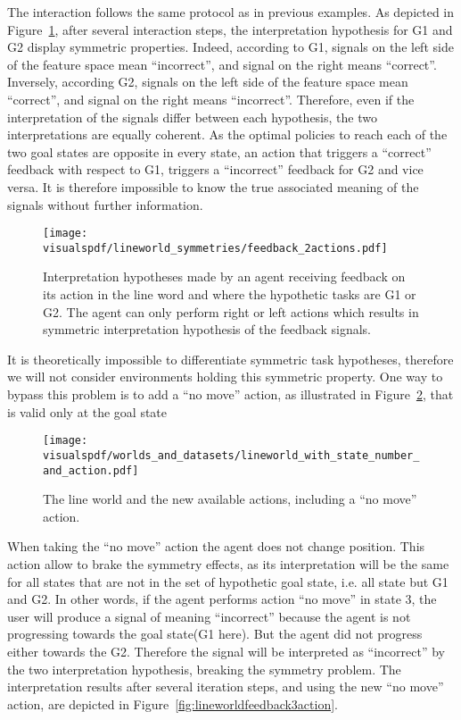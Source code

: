 The interaction follows the same protocol as in previous examples. As depicted in Figure~\ref{fig:lineworldfeedback2action}, after several interaction steps, the interpretation hypothesis for G1 and G2 display symmetric properties. Indeed, according to G1, signals on the left side of the feature space mean ``incorrect'', and signal on the right means ``correct''. Inversely, according G2, signals on the left side of the feature space mean ``correct'', and signal on the right means ``incorrect''. Therefore, even if the interpretation of the signals differ between each hypothesis, the two interpretations are equally coherent. As the optimal policies to reach each of the two goal states are opposite in every state, an action that triggers a ``correct'' feedback with respect to G1, triggers a ``incorrect'' feedback for G2 and vice versa. It is therefore impossible to know the true associated meaning of the signals without further information.

\begin{figure}[!htbp]
  \centering
  \texttt{[image: \\visualspdf/lineworld\_symmetries/feedback\_2actions.pdf]}
  \caption{Interpretation hypotheses made by an agent receiving feedback on its action in the line word and where the hypothetic tasks are G1 or G2. The agent can only perform right or left actions which results in symmetric interpretation hypothesis of the feedback signals.}
  \label{fig:lineworldfeedback2action}
\end{figure}

It is theoretically impossible to differentiate symmetric task hypotheses, therefore we will not consider environments holding this symmetric property. One way to bypass this problem is to add a ``no move'' action, as illustrated in Figure~\ref{fig:lineworld3action}, that is valid only at the goal state

\begin{figure}[!htbp]
  \centering
  \texttt{[image: \\visualspdf/worlds\_and\_datasets/lineworld\_with\_state\_number\_and\_action.pdf]}
  \caption{The line world and the new available actions, including a ``no move'' action.}
  \label{fig:lineworld3action}
\end{figure}

When taking the ``no move'' action the agent does not change position. This action allow to brake the symmetry effects, as its interpretation will be the same for all states that are not in the set of hypothetic goal state, i.e. all state but G1 and G2. In other words, if the agent performs action ``no move'' in state 3, the user will produce a signal of meaning ``incorrect'' because the agent is not progressing towards the goal state(G1 here). But the agent did not progress either towards the G2. Therefore the signal will be interpreted as ``incorrect'' by the two interpretation hypothesis, breaking the symmetry problem. The interpretation results after several iteration steps, and using the new ``no move'' action, are depicted in Figure~\ref{fig:lineworldfeedback3action}.

